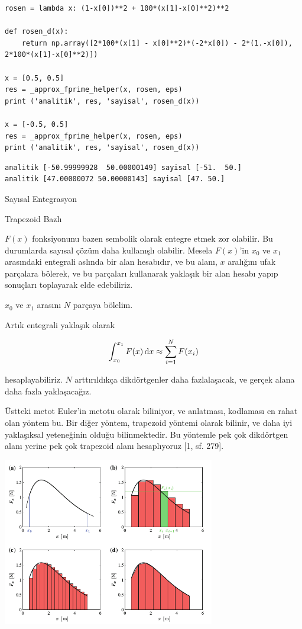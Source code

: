 \documentclass[12pt,fleqn]{article}\usepackage{../../common}
\begin{document}
\begin{verbatim}
rosen = lambda x: (1-x[0])**2 + 100*(x[1]-x[0]**2)**2

def rosen_d(x):
    return np.array([2*100*(x[1] - x[0]**2)*(-2*x[0]) - 2*(1.-x[0]), 2*100*(x[1]-x[0]**2)])

x = [0.5, 0.5]
res = _approx_fprime_helper(x, rosen, eps)
print ('analitik', res, 'sayisal', rosen_d(x))

x = [-0.5, 0.5]
res = _approx_fprime_helper(x, rosen, eps)
print ('analitik', res, 'sayisal', rosen_d(x))
\end{verbatim}

\begin{verbatim}
analitik [-50.99999928  50.00000149] sayisal [-51.  50.]
analitik [47.00000072 50.00000143] sayisal [47. 50.]
\end{verbatim}

Sayısal Entegrasyon

Trapezoid Bazlı

$F(x)$ fonksiyonunu bazen sembolik olarak entegre etmek zor olabilir. Bu
durumlarda sayısal çözüm daha kullanışlı olabilir. Mesela $F(x)$'in $x_0$
ve $x_1$ arasındaki entegrali aslında bir alan hesabıdır, ve bu alanı, $x$
aralığını ufak parçalara bölerek, ve bu parçaları kullanarak yaklaşık bir
alan hesabı yapıp sonuçları toplayarak elde edebiliriz. 

$x_0$ ve $x_1$ arasını $N$ parçaya bölelim. 

Artık entegrali yaklaşık olarak 

$$
\int_{x_0}^{x_1} F(x) \,\mathrm{d} x \approx \sum_{i=1}^{N} F(x_i)
$$

hesaplayabiliriz. $N$ arttırıldıkça dikdörtgenler daha fazlalaşacak, ve
gerçek alana daha fazla yaklaşacağız. 

Üstteki metot Euler'in metotu olarak biliniyor, ve anlatması, kodlaması en rahat
olan yöntem bu. Bir diğer yöntem, trapezoid yöntemi olarak bilinir, ve daha iyi
yaklaşıksal yeteneğinin olduğu bilinmektedir. Bu yöntemle pek çok dikdörtgen
alanı yerine pek çok trapezoid alanı hesaplıyoruz [1, sf. 279].

\includegraphics[width=25em]{compscieng_app01numint_01.png}
\end{document}
